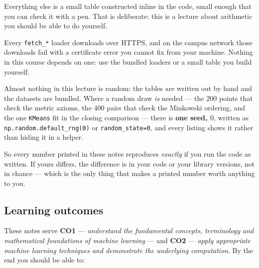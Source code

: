 \documentclass[11pt]{article}
\begin{document}
Everything else is a small table constructed inline in the code, small enough
that you can check it with a pen. That is deliberate: this is a lecture about
arithmetic you should be able to do yourself.

\begin{caution}
Every \texttt{fetch\_*} loader downloads over HTTPS, and on the campus network
those downloads fail with a certificate error you cannot fix from your machine.
Nothing in this course depends on one: use the bundled loaders or a small
table you build yourself.
\end{caution}

\begin{keyidea}
Almost nothing in this lecture is random: the tables are written out by hand
and the datasets are bundled. Where a random draw \emph{is} needed --- the
$200$ points that check the metric axioms, the $400$ pairs that check the
Minkowski ordering, and the one \texttt{KMeans} fit in the closing comparison
--- there is \textbf{one seed, $0$}, written as
\texttt{np.random.default\_rng(0)} or \texttt{random\_state=0}, and every
listing shows it rather than hiding it in a helper.

So every number printed in these notes reproduces \emph{exactly} if you run
the code as written. If yours differs, the difference is in your code or your
library versions, not in chance --- which is the only thing that makes a
printed number worth anything to you.
\end{keyidea}

\subsection{Learning outcomes}

These notes serve \textbf{CO1} --- \emph{understand the fundamental concepts,
terminology and mathematical foundations of machine learning} --- and
\textbf{CO2} --- \emph{apply appropriate machine learning techniques and
demonstrate the underlying computation}. By the end you should be able to:
\end{document}
